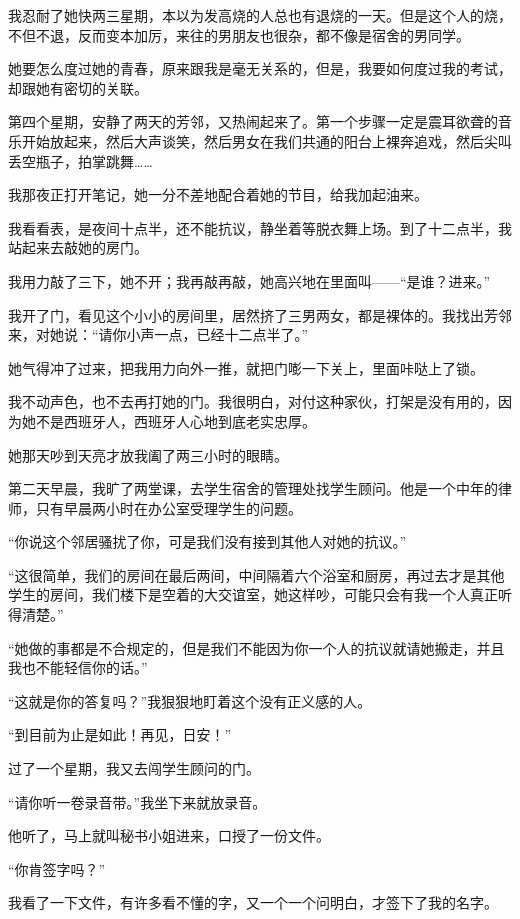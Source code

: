 \par 我忍耐了她快两三星期，本以为发高烧的人总也有退烧的一天。但是这个人的烧，不但不退，反而变本加厉，来往的男朋友也很杂，都不像是宿舍的男同学。
\par 她要怎么度过她的青春，原来跟我是毫无关系的，但是，我要如何度过我的考试，却跟她有密切的关联。
\par 第四个星期，安静了两天的芳邻，又热闹起来了。第一个步骤一定是震耳欲聋的音乐开始放起来，然后大声谈笑，然后男女在我们共通的阳台上裸奔追戏，然后尖叫丢空瓶子，拍掌跳舞……
\par 我那夜正打开笔记，她一分不差地配合着她的节目，给我加起油来。
\par 我看看表，是夜间十点半，还不能抗议，静坐着等脱衣舞上场。到了十二点半，我站起来去敲她的房门。
\par 我用力敲了三下，她不开；我再敲再敲，她高兴地在里面叫——“是谁？进来。”
\par 我开了门，看见这个小小的房间里，居然挤了三男两女，都是裸体的。我找出芳邻来，对她说：“请你小声一点，已经十二点半了。”
\par 她气得冲了过来，把我用力向外一推，就把门嘭一下关上，里面咔哒上了锁。
\par 我不动声色，也不去再打她的门。我很明白，对付这种家伙，打架是没有用的，因为她不是西班牙人，西班牙人心地到底老实忠厚。
\par 她那天吵到天亮才放我阖了两三小时的眼睛。
\par 第二天早晨，我旷了两堂课，去学生宿舍的管理处找学生顾问。他是一个中年的律师，只有早晨两小时在办公室受理学生的问题。
\par “你说这个邻居骚扰了你，可是我们没有接到其他人对她的抗议。”
\par “这很简单，我们的房间在最后两间，中间隔着六个浴室和厨房，再过去才是其他学生的房间，我们楼下是空着的大交谊室，她这样吵，可能只会有我一个人真正听得清楚。”
\par “她做的事都是不合规定的，但是我们不能因为你一个人的抗议就请她搬走，并且我也不能轻信你的话。”
\par “这就是你的答复吗？”我狠狠地盯着这个没有正义感的人。
\par “到目前为止是如此！再见，日安！”
\par 过了一个星期，我又去闯学生顾问的门。
\par “请你听一卷录音带。”我坐下来就放录音。
\par 他听了，马上就叫秘书小姐进来，口授了一份文件。
\par “你肯签字吗？”
\par 我看了一下文件，有许多看不懂的字，又一个一个问明白，才签下了我的名字。
